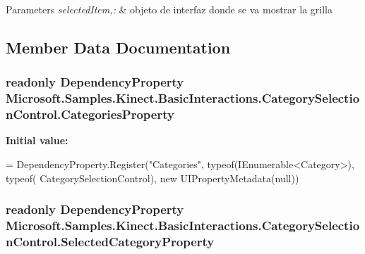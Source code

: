 \begin{DoxyParams}{Parameters}
{\em selected\-Item,\-:} & objeto de interfaz donde se va mostrar la grilla \\
\hline
\end{DoxyParams}


\subsection{Member Data Documentation}
\hypertarget{class_microsoft_1_1_samples_1_1_kinect_1_1_basic_interactions_1_1_category_selection_control_a8d134c647d15677f2f80b071adce1b96}{
\subsubsection[{Categories\-Property}]{\setlength{\rightskip}{0pt plus 5cm}readonly Dependency\-Property Microsoft.\-Samples.\-Kinect.\-Basic\-Interactions.\-Category\-Selection\-Control.\-Categories\-Property\hspace{0.3cm}{\ttfamily [static]}}}\label{class_microsoft_1_1_samples_1_1_kinect_1_1_basic_interactions_1_1_category_selection_control_a8d134c647d15677f2f80b071adce1b96}
{\bfseries Initial value\-:}
\begin{DoxyCode}
=
            DependencyProperty.Register(\textcolor{stringliteral}{"Categories"}, typeof(IEnumerable<Category>), typeof(
      CategorySelectionControl), \textcolor{keyword}{new} UIPropertyMetadata(null))
\end{DoxyCode}
\hypertarget{class_microsoft_1_1_samples_1_1_kinect_1_1_basic_interactions_1_1_category_selection_control_a386f8dea033cefda87205d8009de14dd}{
\subsubsection[{Selected\-Category\-Property}]{\setlength{\rightskip}{0pt plus 5cm}readonly Dependency\-Property Microsoft.\-Samples.\-Kinect.\-Basic\-Interactions.\-Category\-Selection\-Control.\-Selected\-Category\-Property\hspace{0.3cm}{\ttfamily [static]}}}\label{class_microsoft_1_1_samples_1_1_kinect_1_1_basic_interactions_1_1_category_selection_control_a386f8dea033cefda87205d8009de14dd}
